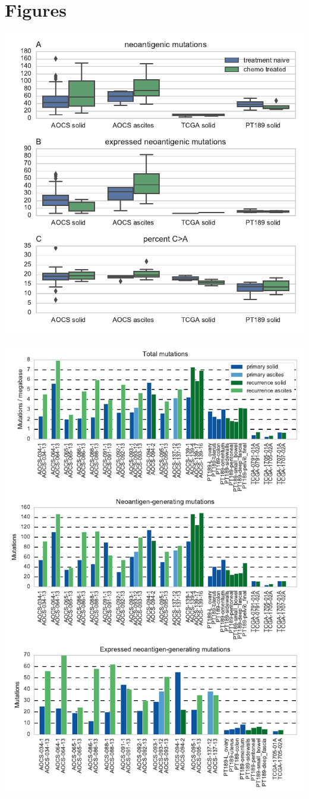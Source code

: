 \section{Figures}
\includegraphics{figures/fig1.pdf}

\includegraphics{figures/paired_counts.pdf}


